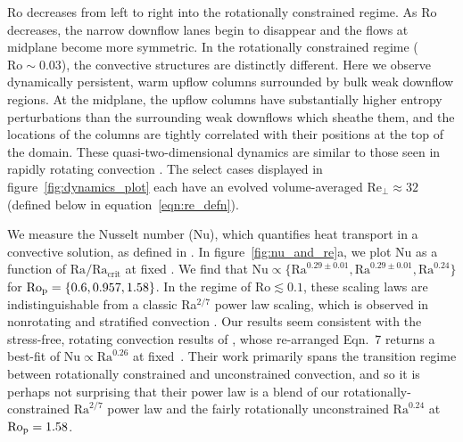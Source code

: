 Ro decreases from left to right into the rotationally constrained 
regime. As Ro decreases, the narrow downflow lanes begin to disappear
and the flows at midplane become more symmetric. In the rotationally constrained regime ($\text{Ro} \sim 0.03$), 
the convective structures are distinctly different. 
Here we observe dynamically persistent, warm upflow columns 
surrounded by bulk weak downflow regions. At the midplane, the upflow columns have substantially
higher entropy perturbations than the surrounding weak downflows which sheathe them, 
and the locations of the columns
are tightly correlated with their positions at the top of the domain. These quasi-two-dimensional 
dynamics are similar to those seen in rapidly 
rotating \RB convection \cite[e.g.,][]{stellmach&all2014}. 
The select cases displayed in figure~\ref{fig:dynamics_plot} each have an evolved volume-averaged
$\text{Re}_{\perp} \approx 32$ (defined below in equation~\ref{eqn:re_defn}).

We measure the Nusselt number (Nu), which quantifies heat transport in a convective
solution, as defined in \AB.
In figure~\ref{fig:nu_and_re}a, we plot Nu as a function
of $\text{Ra}/\text{Ra}_\text{crit}$ at fixed \pro. We find that $\text{Nu} \propto \{\text{Ra}^{0.29 \pm 0.01}, \text{Ra}^{0.29 \pm 0.01}, \text{Ra}^{0.24}\}$
for $\text{Ro}_{\text{p}} = \{0.6, 0.957, 1.58\}$. In the regime of $\text{Ro} \lesssim 0.1$, these scaling laws are indistinguishable
from a classic Ra$^{2/7}$ power law scaling,
which is observed in nonrotating \RB and stratified convection \cite[][\AB]{ahlers&all2009}.
Our results seem consistent with the stress-free, rotating \RB convection results of
\cite{schmitz&tilgner2009}, whose re-arranged Eqn.~7 returns a best-fit of
$\text{Nu} \propto \text{Ra}^{0.26}$ at fixed \pro$\,$. Their work primarily spans the transition
regime between rotationally constrained and unconstrained convection, and so it is perhaps not
surprising that their power law is a blend of our rotationally-constrained $\text{Ra}^{2/7}$ power
law and the fairly rotationally unconstrained $\text{Ra}^{0.24}$ at $\text{Ro}_{\text{p}} = 1.58$.

